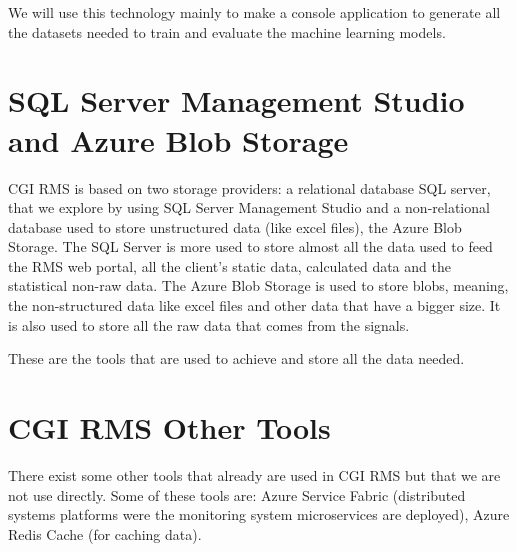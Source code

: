We will use this technology mainly to make a console application to generate all the datasets needed to train and evaluate the machine learning models.


\section{SQL Server Management Studio and Azure Blob Storage} 
\label{sub:if_you_use_this_template}
CGI RMS is based on two storage providers: a relational database SQL server, that we explore by using SQL Server Management Studio and a non-relational database used to store unstructured data (like excel files), the Azure Blob Storage.
The SQL Server is more used to store almost all the data used to feed the RMS web portal, all the client’s static data, calculated data and the statistical non-raw data.
The Azure Blob Storage is used to store blobs, meaning, the non-structured data like excel files and other data that have a bigger size. It is also used to store all the raw data that comes from the signals.

These are the tools that are used to achieve and store all the data needed.


\section{CGI RMS Other Tools} 
\label{sub:if_you_use_this_template}
There exist some other tools that already are used in CGI RMS but that we are not use directly. Some of these tools are: Azure Service Fabric (distributed systems platforms were the monitoring system microservices are deployed), Azure Redis Cache (for caching data).